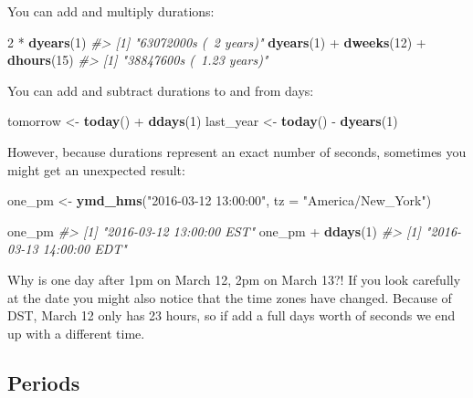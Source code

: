 \documentclass[]{book}
\newenvironment{Shaded}{\begin{snugshade}}{\end{snugshade}}
\newcommand{\KeywordTok}[1]{\textcolor[rgb]{0.13,0.29,0.53}{\textbf{{#1}}}}
\newcommand{\DataTypeTok}[1]{\textcolor[rgb]{0.13,0.29,0.53}{{#1}}}
\newcommand{\DecValTok}[1]{\textcolor[rgb]{0.00,0.00,0.81}{{#1}}}
\newcommand{\StringTok}[1]{\textcolor[rgb]{0.31,0.60,0.02}{{#1}}}
\newcommand{\CommentTok}[1]{\textcolor[rgb]{0.56,0.35,0.01}{\textit{{#1}}}}
\newcommand{\NormalTok}[1]{{#1}}
\begin{document}
You can add and multiply durations:

\begin{Shaded}
\begin{Highlighting}[]
\DecValTok{2} \NormalTok{*}\StringTok{ }\KeywordTok{dyears}\NormalTok{(}\DecValTok{1}\NormalTok{)}
\CommentTok{#> [1] "63072000s (~2 years)"}
\KeywordTok{dyears}\NormalTok{(}\DecValTok{1}\NormalTok{) +}\StringTok{ }\KeywordTok{dweeks}\NormalTok{(}\DecValTok{12}\NormalTok{) +}\StringTok{ }\KeywordTok{dhours}\NormalTok{(}\DecValTok{15}\NormalTok{)}
\CommentTok{#> [1] "38847600s (~1.23 years)"}
\end{Highlighting}
\end{Shaded}

You can add and subtract durations to and from days:

\begin{Shaded}
\begin{Highlighting}[]
\NormalTok{tomorrow <-}\StringTok{ }\KeywordTok{today}\NormalTok{() +}\StringTok{ }\KeywordTok{ddays}\NormalTok{(}\DecValTok{1}\NormalTok{)}
\NormalTok{last_year <-}\StringTok{ }\KeywordTok{today}\NormalTok{() -}\StringTok{ }\KeywordTok{dyears}\NormalTok{(}\DecValTok{1}\NormalTok{)}
\end{Highlighting}
\end{Shaded}

However, because durations represent an exact number of seconds,
sometimes you might get an unexpected result:

\begin{Shaded}
\begin{Highlighting}[]
\NormalTok{one_pm <-}\StringTok{ }\KeywordTok{ymd_hms}\NormalTok{(}\StringTok{"2016-03-12 13:00:00"}\NormalTok{, }\DataTypeTok{tz =} \StringTok{"America/New_York"}\NormalTok{)}

\NormalTok{one_pm}
\CommentTok{#> [1] "2016-03-12 13:00:00 EST"}
\NormalTok{one_pm +}\StringTok{ }\KeywordTok{ddays}\NormalTok{(}\DecValTok{1}\NormalTok{)}
\CommentTok{#> [1] "2016-03-13 14:00:00 EDT"}
\end{Highlighting}
\end{Shaded}

Why is one day after 1pm on March 12, 2pm on March 13?! If you look
carefully at the date you might also notice that the time zones have
changed. Because of DST, March 12 only has 23 hours, so if add a full
days worth of seconds we end up with a different time.

\subsection{Periods}\label{periods}
\end{document}
